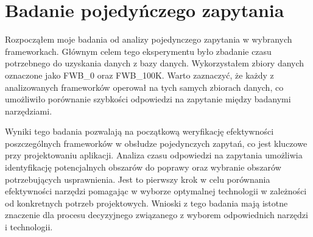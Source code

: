 \section{Badanie pojedyńczego zapytania}

Rozpocząłem moje badania od analizy pojedynczego zapytania w wybranych frameworkach.
Głównym celem tego eksperymentu było zbadanie czasu potrzebnego do uzyskania danych z bazy danych.
Wykorzystałem zbiory danych oznaczone jako FWB\_0 oraz FWB\_100K.
Warto zaznaczyć, że każdy z analizowanych frameworków operował na tych samych zbiorach danych, co umożliwiło porównanie szybkości odpowiedzi na zapytanie między badanymi narzędziami.

Wyniki tego badania pozwalają na początkową weryfikację efektywności poszczególnych frameworków w obsłudze pojedynczych zapytań, co jest kluczowe przy projektowaniu aplikacji.
Analiza czasu odpowiedzi na zapytania umożliwia identyfikację potencjalnych obszarów do poprawy oraz wybranie obszarów potrzebujących usprawnienia.
Jest to pierwszy krok w celu porównania efektywności narzędzi pomagając w wyborze optymalnej technologii w zależności od konkretnych potrzeb projektowych.
Wnioski z tego badania mają istotne znaczenie dla procesu decyzyjnego związanego z wyborem odpowiednich narzędzi i technologii.



